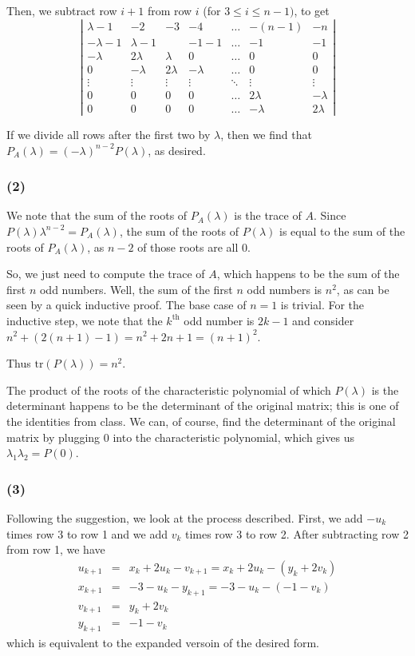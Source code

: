 \documentclass{article}
\newcommand{\trace}{\textrm{tr}}
\begin{document}
Then, we subtract row $i + 1$ from row $i$ (for $3 \leq i \leq n-1)$, to get
\[
\left|
\begin{array}{cccccccc}
\lambda - 1 & -2 & -3 & -4 & \dots & -(n-1)& -n\\
-\lambda - 1 & \lambda - 1 & & -1 -1 & \dots & -1 & -1\\
-\lambda  & 2 \lambda & \lambda & 0 & \dots & 0 & 0\\
0 & -\lambda & 2\lambda & -\lambda & \dots & 0 & 0\\
\vdots & \vdots & \vdots & \vdots & \ddots & \vdots & \vdots\\
0 & 0 & 0 &  0 &\dots & 2\lambda  & -\lambda \\
0 & 0 & 0 & 0 & \dots & -\lambda & 2\lambda
\end{array}
\right|
\]

If we divide all rows after the first two by $\lambda$, then we find that 
$P_A(\lambda) = (-\lambda)^{n-2}P(\lambda)$, as desired.

\subsubsection{(2)}
We note that the sum of the roots of $P_A(\lambda)$ is the trace of $A$.
Since $P(\lambda) \lambda^{n-2} = P_A(\lambda)$, the sum of the roots of $P(\lambda)$ is equal to the sum of the roots of $P_A(\lambda)$, as $n-2$ of those roots are all 0.

So, we just need to compute the trace of $A$, which happens to be the sum of the first $n$ odd numbers.
Well, the sum of the first $n$ odd numbers is $n^2$, as can be seen by a quick inductive proof.  
The base case of $n=1$ is trivial. For the inductive step, we note that the $k^\textrm{th}$ odd number is $2k-1$ and consider 
$n^2 + (2(n+1)-1) = n^2 + 2n + 1 = (n+1)^2$.

Thus $\trace(P(\lambda)) = n^2$.

\medskip
The product of the roots of the characteristic polynomial of which $P(\lambda)$ is the determinant happens to be the determinant of the original matrix; this is one of the identities from class.
We can, of course, find the determinant of the original matrix by plugging $0$ into the characteristic polynomial, which gives us $\lambda_1\lambda_2 = P(0)$.

\subsubsection{(3)}
Following the suggestion, we look at the process described. First, we add
$-u_k$ times row 3 to row 1 and we add $v_k$ times row 3 to row 2.
After subtracting row 2 from row 1, we have
\begin{eqnarray*}
u_{k+1} &=&  x_k + 2u_k - v_{k+1} = x_k + 2u_k - (y_k + 2v_k)\\
x_{k+1} &=&  -3 - u_k - y_{k+1} = -3 - u_k - (-1 - v_k)\\
v_{k+1} &=&  y_k + 2v_k \\
y_{k+1} &=&  -1 - v_k
\end{eqnarray*}
which is equivalent to the expanded versoin of the desired form.
\end{document}
